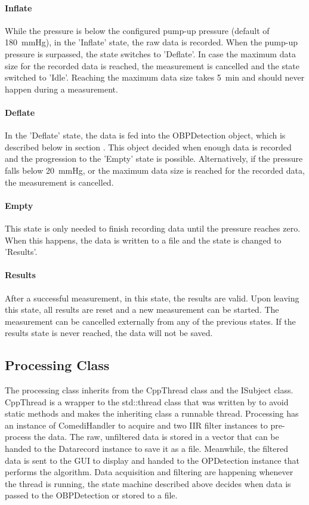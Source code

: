 \paragraph{Inflate} While the pressure is below the configured pump-up pressure (default of \SI{180}{\mmHg}), in the 'Inflate' state, the raw data is recorded. When the pump-up pressure is surpassed, the state switches to 'Deflate'. In case the maximum data size for the recorded data is reached, the measurement is cancelled and the state switched to 'Idle'. Reaching the maximum data size takes \SI{5}{\minute} and should never happen during a measurement.

\paragraph{Deflate} In the 'Deflate' state, the data is fed into the OBPDetection object, which is described below in section . This object decided when enough data is recorded and the progression to the 'Empty' state is possible. Alternatively, if the pressure falls below \SI{20}{\mmHg}, or the maximum data size is reached for the recorded data, the measurement is cancelled. 

\paragraph{Empty} This state is only needed to finish recording data until the pressure reaches zero. When this happens, the data is written to a file and the state is changed to 'Results'.

\paragraph{Results} After a successful measurement, in this state, the results are valid. Upon leaving this state, all results are reset and a new measurement can be started. The measurement can be cancelled externally from any of the previous states.  If the results state is never reached, the data will not be saved.


\subsection{Processing Class} 
The processing class inherits from the CppThread class and the ISubject class. CppThread is a wrapper to the std::thread class that was written by \citet{Porr2020Thread} to avoid static methods and makes the inheriting class a runnable thread. Processing has an instance of ComediHandler to acquire and two IIR filter instances to pre-process the data. The raw, unfiltered data is stored in a vector that can be handed to the Datarecord instance to save it as a file. Meanwhile, the filtered data is sent to the GUI to display and handed to the OPDetection instance that performs the algorithm. Data acquisition and filtering are happening whenever the thread is running, the state machine described above decides when data is passed to the OBPDetection or stored to a file. 

